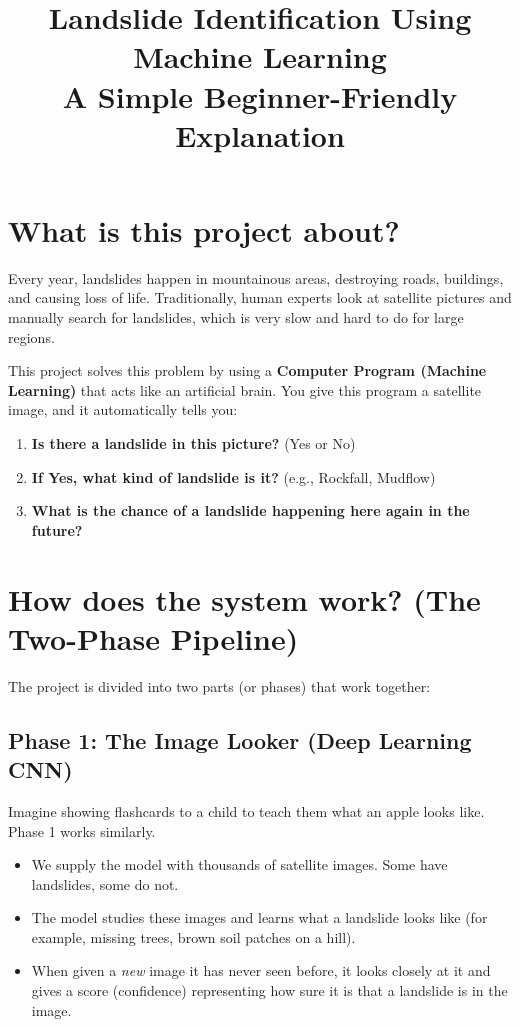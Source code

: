 \documentclass[11pt]{article}
\title{Landslide Identification Using Machine Learning \\ \large A Simple Beginner-Friendly Explanation}
\author{}
\date{}
\begin{document}
\maketitle

\section{What is this project about?}
Every year, landslides happen in mountainous areas, destroying roads, buildings, and causing loss of life. Traditionally, human experts look at satellite pictures and manually search for landslides, which is very slow and hard to do for large regions.

This project solves this problem by using a \textbf{Computer Program (Machine Learning)} that acts like an artificial brain. You give this program a satellite image, and it automatically tells you:
\begin{enumerate}
    \item \textbf{Is there a landslide in this picture?} (Yes or No)
    \item \textbf{If Yes, what kind of landslide is it?} (e.g., Rockfall, Mudflow)
    \item \textbf{What is the chance of a landslide happening here again in the future?}
\end{enumerate}

\section{How does the system work? (The Two-Phase Pipeline)}
The project is divided into two parts (or phases) that work together:

\subsection{Phase 1: The Image Looker (Deep Learning CNN)}
Imagine showing flashcards to a child to teach them what an apple looks like. Phase 1 works similarly.
\begin{itemize}
    \item We supply the model with thousands of satellite images. Some have landslides, some do not.
    \item The model studies these images and learns what a landslide looks like (for example, missing trees, brown soil patches on a hill).
    \item When given a \textit{new} image it has never seen before, it looks closely at it and gives a score (confidence) representing how sure it is that a landslide is in the image.
\end{itemize}
\end{document}
